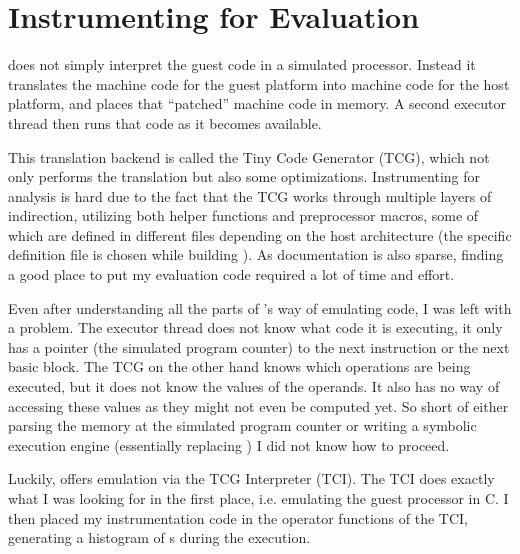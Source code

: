 \section{Instrumenting \qemu{} for Evaluation}
\label{evaluation}
\qemu{} does not simply interpret the guest code in a simulated processor.
Instead it translates the machine code for the guest platform into machine code for the host platform, and places that ``patched'' machine code in memory.
A second executor thread then runs that code as it becomes available.

This translation backend is called the Tiny Code Generator (TCG), which not only performs the translation but also some optimizations.
Instrumenting \qemu{} for analysis is hard due to the fact that the TCG works through multiple layers of indirection, utilizing both helper functions and preprocessor macros, some of which are defined in different files depending on the host architecture (the specific definition file is chosen while building \qemu{}).
As documentation is also sparse, finding a good place to put my evaluation code required a lot of time and effort.

Even after understanding all the parts of \qemu{}'s way of emulating code, I was left with a problem.
The executor thread does not know what code it is executing, it only has a pointer (the simulated program counter) to the next instruction or the next basic block.
The TCG on the other hand knows which operations are being executed, but it does not know the values of the operands.
It also has no way of accessing these values as they might not even be computed yet.
So short of either parsing the memory at the simulated program counter or writing a symbolic execution engine (essentially replacing \qemu{}) I did not know how to proceed.

Luckily, \qemu{} offers emulation via the TCG Interpreter (TCI).
The TCI does exactly what I was looking for in the first place, i.e. emulating the guest processor in C.
I then placed my instrumentation code in the operator functions of the TCI, generating a histogram of \hammingw{}s during the execution.
